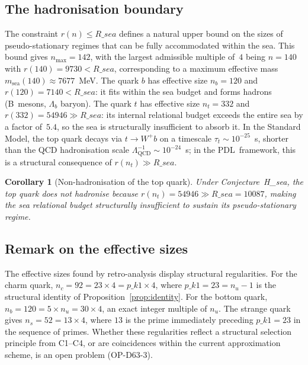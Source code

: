 \documentclass[12pt,a4paper]{article}
\def\PDL{PDL}
\def\Rsea{R\_sea}
\def\pkone{p\_k1}
\theoremstyle{plain}
\newtheorem{corollary}[theorem]{Corollary}
\theoremstyle{definition}
\theoremstyle{remark}
\newcommand{\PDL}{\textnormal{PDL}}
\newcommand{\nnu}{n_u}
\newcommand{\Rsea}{R_{\mathrm{sea}}}
\newcommand{\pkone}{p_{k_1}}
\begin{document}
\subsection{The hadronisation boundary}
\label{subsec:boundary}

The constraint $r(n) \leq \Rsea$ defines a natural upper bound on the sizes of pseudo-stationary regimes that can be fully accommodated within the sea. This bound gives $n_{\max} = 142$, with the largest admissible multiple of~$4$ being $n = 140$ with $r(140) = 9730 < \Rsea$, corresponding to a maximum effective mass $m_{\mathrm{sea}}(140) \approx 7677$~MeV. The quark $b$ has effective size $n_b = 120$ and $r(120) = 7140 < \Rsea$: it fits within the sea budget and forms hadrons (B~mesons, $\Lambda_b$ baryon). The quark $t$ has effective size $n_t = 332$ and $r(332) = 54946 \gg \Rsea$: its internal relational budget exceeds the entire sea by a factor of~$5.4$, so the sea is structurally insufficient to absorb it. In the Standard Model, the top quark decays via $t \to W^+b$ on a timescale $\tau_t \sim 10^{-25}$~s, shorter than the QCD hadronisation scale $\Lambda_{\mathrm{QCD}}^{-1} \sim 10^{-24}$~s; in the \PDL\ framework, this is a structural consequence of $r(n_t) \gg \Rsea$.

\begin{corollary}[Non-hadronisation of the top quark]\label{cor:top}
Under Conjecture~H\_sea, the top quark does not hadronise because $r(n_t) = 54946 \gg \Rsea = 10087$, making the sea relational budget structurally insufficient to sustain its pseudo-stationary regime.
\end{corollary}

\subsection{Remark on the effective sizes}
\label{subsec:sizes}

The effective sizes found by retro-analysis display structural regularities. For the charm quark, $n_c = 92 = 23 \times 4 = \pkone \times 4$, where $\pkone = 23 = \nnu - 1$ is the structural identity of Proposition~\ref{prop:identity}. For the bottom quark, $n_b = 120 = 5 \times \nnu = 30 \times 4$, an exact integer multiple of $\nnu$. The strange quark gives $n_s = 52 = 13 \times 4$, where $13$ is the prime immediately preceding $\pkone = 23$ in the sequence of primes. Whether these regularities reflect a structural selection principle from C1--C4, or are coincidences within the current approximation scheme, is an open problem (OP-D63-3).
\end{document}
